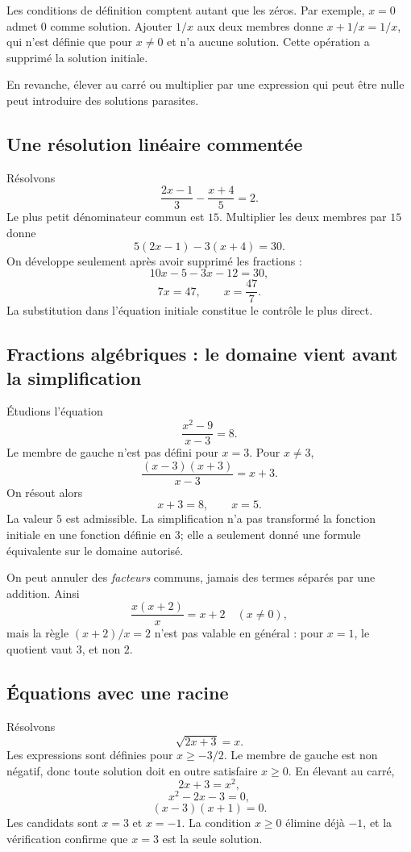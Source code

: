 Les conditions de définition comptent autant que les zéros. Par exemple, $x=0$ admet $0$ comme solution. Ajouter $1/x$ aux deux membres donne $x+1/x=1/x$, qui n'est définie que pour $x\ne0$ et n'a aucune solution. Cette opération a supprimé la solution initiale.

En revanche, élever au carré ou multiplier par une expression qui peut être nulle peut introduire des solutions parasites.

\subsection{Une résolution linéaire commentée}

Résolvons
\[
\frac{2x-1}{3}-\frac{x+4}{5}=2.
\]
Le plus petit dénominateur commun est $15$. Multiplier les deux membres par $15$ donne
\[
5(2x-1)-3(x+4)=30.
\]
On développe seulement après avoir supprimé les fractions :
\[
10x-5-3x-12=30,
\]
\[
7x=47,
\qquad
x=\frac{47}{7}.
\]
La substitution dans l'équation initiale constitue le contrôle le plus direct.

\subsection{Fractions algébriques : le domaine vient avant la simplification}

Étudions l'équation
\[
\frac{x^2-9}{x-3}=8.
\]
Le membre de gauche n'est pas défini pour $x=3$. Pour $x\neq3$,
\[
\frac{(x-3)(x+3)}{x-3}=x+3.
\]
On résout alors
\[
x+3=8,
\qquad x=5.
\]
La valeur $5$ est admissible. La simplification n'a pas transformé la fonction initiale en une fonction définie en $3$; elle a seulement donné une formule équivalente sur le domaine autorisé.

\begin{warningbox}
On peut annuler des \emph{facteurs} communs, jamais des termes séparés par une addition. Ainsi
\[
\frac{x(x+2)}{x}=x+2\quad(x\neq0),
\]
mais la règle \((x+2)/x=2\) n'est pas valable en général : pour \(x=1\), le quotient vaut \(3\), et non \(2\).
\end{warningbox}

\subsection{Équations avec une racine}

Résolvons
\[
\sqrt{2x+3}=x.
\]
Les expressions sont définies pour $x\ge-3/2$. Le membre de gauche est non négatif, donc toute solution doit en outre satisfaire $x\geq0$. En élevant au carré,
\[
2x+3=x^2,
\]
\[
x^2-2x-3=0,
\]
\[
(x-3)(x+1)=0.
\]
Les candidats sont $x=3$ et $x=-1$. La condition $x\geq0$ élimine déjà $-1$, et la vérification confirme que $x=3$ est la seule solution.

